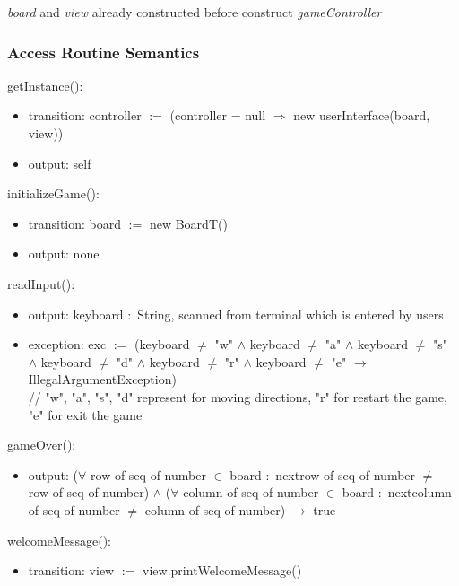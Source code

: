 \documentclass[12pt]{article}
\begin{document}
\textit{board} and \textit{view} already constructed before construct \textit{gameController}


\subsubsection* {Access Routine Semantics}

getInstance():
\begin{itemize}
  \item transition: controller $:=$ (controller = null $\Rightarrow$ new userInterface(board, view))
  \item output: self
\end{itemize}

\noindent initializeGame():
\begin{itemize}
\item transition: board $:=$ new BoardT()
\item output: none
\end{itemize}

\noindent readInput():
\begin{itemize}
\item output: keyboard $:$ String, scanned from terminal which is entered by users
\item exception: exc $:=$ (keyboard $\neq$ "w" $\land$ keyboard $\neq$ "a" $\land$ keyboard 
                           $\neq$ "s" $\land$ keyboard $\neq$ "d" $\land$ keyboard $\neq$ "r" $\land$ keyboard 
                           $\neq$ "e" $\rightarrow$ IllegalArgumentException) \\
\quad // "w", "a", "s", "d" represent for moving directions, "r" for restart the game, "e" for exit the game
\end{itemize}

\noindent gameOver():
\begin{itemize}
  \item output: ($\forall$ row of seq of number $\in$ board $:$ nextrow of seq of number $\neq$ row of seq of number) $\land$
                ($\forall$ column of seq of number $\in$ board $:$ nextcolumn of seq of number $\neq$ column of seq of number)
                $\rightarrow$ true
\end{itemize}

\noindent welcomeMessage():
\begin{itemize}
  \item transition: view $:=$ view.printWelcomeMessage()
\end{itemize}
\end{document}
